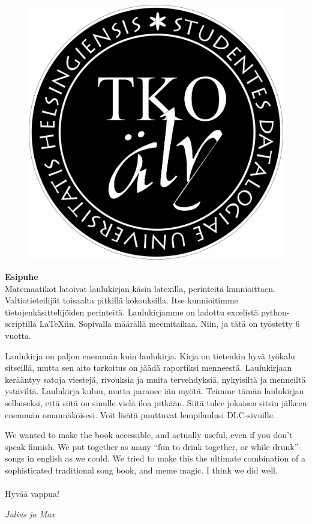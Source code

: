 \afterpage{\blankpage}
\begin{figure}[h!]
\centering
\includegraphics[scale=0.4]{graphics/logo.png}
\end{figure}

\newpage

\textbf{Esipuhe}
\\

Matemaatikot latoivat laulukirjan käsin latexilla, perinteitä kunnioittaen.
Valtiotieteilijät toisaalta pitkillä kokouksilla. Itse kunnioitimme
tietojenkäsittelijöiden perinteitä. Laulu\-kirjamme on ladottu excelistä
python-scriptillä \LaTeX{}iin. Sopivalla määrällä mee\-mi\-taikaa. Niin, ja tätä on työstetty 6 vuotta.

Laulukirja on paljon enemmän kuin laulukirja. Kirja on tieten\-kin hyvä työkalu
sitseillä, mutta sen aito tarkoitus on jäädä ra\-por\-tik\-si menneestä. Laulukirjaan
kerääntyy satoja viestejä, rivouksia ja muita tervehdyksiä, nykyisiltä ja
menneiltä ystäviltä. Laulukirja kuluu, mutta paranee iän myötä. Teimme tämän
laulukirjan sel\-lai\-sek\-si, että siitä on sinulle vielä iloa pitkään. Siitä tulee
jokaisen sitsin jälkeen enemmän omannäköisesi. Voit lisätä puuttuvat lempi\-laulusi DLC-sivuille.

We wanted to make the book accessible, and actually useful, even if you don’t
speak finnish. We put together as many “fun to drink together, or while drunk”-songs
in english as we could. We tried to make this the ultimate combination of a
sophisticated traditional song book, and meme magic. I think we did well.
\\
\\
Hyvää vappua!

\vfill
\textit{Julius ja Max}

\newpage
\blankpage
